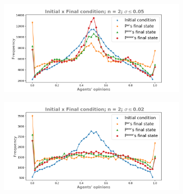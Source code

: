 \documentclass{article}
\begin{document}
    \begin{figure}[H]
  \centering
    \begin{subfigure}[b]{0.49\textwidth}
      \includegraphics[width=\textwidth]{img/oiks/oiks_smallsigma005_n2.png}
    \end{subfigure}
         \begin{subfigure}[b]{0.49\textwidth}
      \includegraphics[width=\textwidth]{img/oiks/oiks_smallsigma002_n2.png}
    \end{subfigure}
    

\end{figure}
\end{document}
